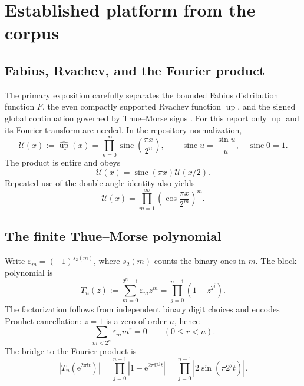 \documentclass[11pt,oneside]{article}
\theoremstyle{definition}
\theoremstyle{remark}
\newcommand{\Up}{\operatorname{up}}
\newcommand{\sinc}{\operatorname{sinc}}
\newcommand{\e}{\mathrm e}
\newcommand{\ii}{\mathrm i}
\newcommand{\eps}{\varepsilon}
\newcommand{\wt}{s_2}
\begin{document}
\section{Established platform from the corpus}\label{sec:platform}

\subsection{Fabius, Rvachev, and the Fourier product}

The primary exposition carefully separates the bounded Fabius distribution
function $F$, the even compactly supported Rvachev function $\Up$, and the signed
global continuation governed by Thue--Morse signs \cite{proveit,ariascompact,ariasarith}.
For this report only $\Up$ and its Fourier transform are needed. In the repository
normalization,
\begin{equation}
 \mathscr U(x):=\widehat{\Up}(x)
 =\prod_{n=0}^{\infty}\sinc\!\left(\frac{\pi x}{2^n}\right),
 \qquad \sinc u=\frac{\sin u}{u},\quad\sinc0=1.
 \label{eq:U-product}
\end{equation}
The product is entire and obeys
\begin{equation}
 \mathscr U(x)=\sinc(\pi x)\mathscr U(x/2).
 \label{eq:U-refine}
\end{equation}
Repeated use of the double-angle identity also yields
\begin{equation}
 \mathscr U(x)=\prod_{m=1}^{\infty}\left(\cos\frac{\pi x}{2^m}\right)^m.
 \label{eq:U-cos}
\end{equation}

\subsection{The finite Thue--Morse polynomial}

Write $\eps_m=(-1)^{\wt(m)}$, where $\wt(m)$ counts the binary ones in $m$. The
block polynomial is
\begin{equation}
 T_n(z):=\sum_{m=0}^{2^n-1}\eps_mz^m
       =\prod_{j=0}^{n-1}(1-z^{2^j}).
 \label{eq:TM-poly}
\end{equation}
The factorization follows from independent binary digit choices and encodes Prouhet
cancellation: $z=1$ is a zero of order $n$, hence
\[
 \sum_{m<2^n}\eps_mm^r=0\qquad(0\le r<n).
\]
The bridge to the Fourier product is
\begin{equation}
 |T_n(\e^{2\pi\ii t})|
 =\prod_{j=0}^{n-1}|1-\e^{2\pi\ii2^jt}|
 =\prod_{j=0}^{n-1}|2\sin(\pi2^jt)|.
 \label{eq:T-Q}
\end{equation}
\end{document}
